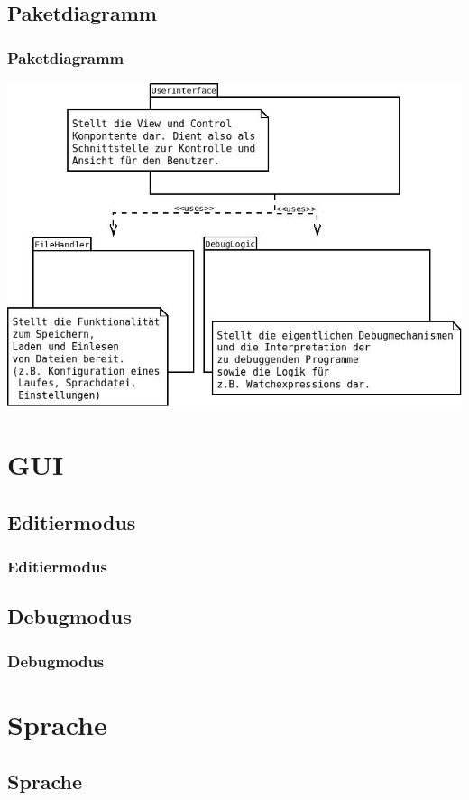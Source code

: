 \documentclass{beamer}
\begin{document}
\subsection{Paketdiagramm}
\begin{frame}
\frametitle{Paketdiagramm}
\includegraphics[scale=0.3]{../pakete}
\end{frame}

\section{GUI}
\subsection{Editiermodus}
\begin{frame}
\frametitle{Editiermodus}
\end{frame}

\subsection{Debugmodus}
\begin{frame}
\frametitle{Debugmodus}
\end{frame}

\section{Sprache}
\subsection{Sprache}
\end{document}
